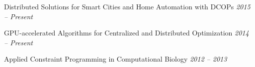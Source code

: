 
Distributed Solutions for Smart Cities and Home Automation with DCOPs \hfill {\em 2015 -- Present} 

GPU-accelerated Algorithms for Centralized and Distributed Optimization  \hfill {\em 2014 -- Present} 

Applied Constraint Programming in Computational Biology \hfill {\em 2012 -- 2013}


